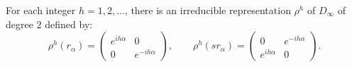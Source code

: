 For each integer $h = 1, 2, \ldots$, there is an irreducible representation $\rho^{h}$ of $D_{\infty}$ of degree $2$ defined by:
$$
\rho^{h}(r_{\alpha}) = \begin{pmatrix} e^{i h \alpha} & 0 \\ 0 & e^{-i h \alpha} \end{pmatrix}, \qquad
\rho^{h}(s r_{\alpha}) = \begin{pmatrix} 0 & e^{-i h \alpha} \\ e^{i h \alpha} & 0 \end{pmatrix}.
$$
